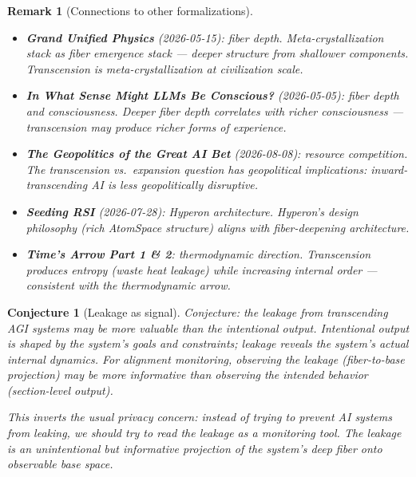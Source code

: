 \documentclass[11pt,a4paper]{article}
\newtheorem{conjecture}[definition]{Conjecture}
\newtheorem{remark}[definition]{Remark}
\begin{document}
\begin{remark}[Connections to other formalizations]
\begin{itemize}
\item \textbf{Grand Unified Physics} (2026-05-15): fiber depth.
  Meta-crystallization stack as fiber emergence stack --- deeper
  structure from shallower components. Transcension is
  meta-crystallization at civilization scale.
\item \textbf{In What Sense Might LLMs Be Conscious?} (2026-05-05):
  fiber depth and consciousness. Deeper fiber depth correlates with
  richer consciousness --- transcension may produce richer forms
  of experience.
\item \textbf{The Geopolitics of the Great AI Bet} (2026-08-08):
  resource competition. The transcension vs.\ expansion question
  has geopolitical implications: inward-transcending AI is less
  geopolitically disruptive.
\item \textbf{Seeding RSI} (2026-07-28): Hyperon architecture. Hyperon's
  design philosophy (rich AtomSpace structure) aligns with
  fiber-deepening architecture.
\item \textbf{Time's Arrow Part 1 \& 2}: thermodynamic direction.
  Transcension produces entropy (waste heat leakage) while increasing
  internal order --- consistent with the thermodynamic arrow.
\end{itemize}
\end{remark}

\begin{conjecture}[Leakage as signal]
Conjecture: the leakage from transcending AGI systems may be more
valuable than the intentional output. Intentional output is shaped
by the system's goals and constraints; leakage reveals the system's
actual internal dynamics. For alignment monitoring, observing the
leakage (fiber-to-base projection) may be more informative than
observing the intended behavior (section-level output).

This inverts the usual privacy concern: instead of trying to prevent
AI systems from leaking, we should try to \emph{read} the leakage as
a monitoring tool. The leakage is an unintentional but informative
projection of the system's deep fiber onto observable base space.
\end{conjecture}
\end{document}
